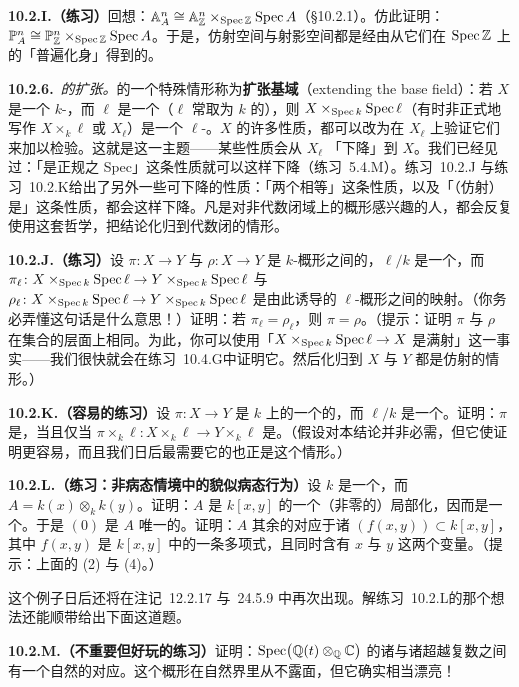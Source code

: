 \textbf{10.2.I.（练习）}\quad 回想：$\mathbb{A}^n_A\cong\mathbb{A}^n_{\mathbb{Z}}\times_{\operatorname{Spec}\mathbb{Z}}\operatorname{Spec} A$（\S10.2.1）。仿此证明：$\mathbb{P}^n_A\cong\mathbb{P}^n_{\mathbb{Z}}\times_{\operatorname{Spec}\mathbb{Z}}\operatorname{Spec} A$。于是，仿射空间与射影空间都是经由\trPullback{}从它们在\trFinalObject{} $\operatorname{Spec}\mathbb{Z}$ 上的「普遍化身」得到的。

\textbf{10.2.6.}\ \emph{\trBaseField{}的扩张。}\quad \trBaseChange{}的一个特殊情形称为\textbf{扩张基域}（extending the base field）：若 $X$ 是一个 $k$-\trScheme，而 $\ell$ 是一个\trFieldExtension（$\ell$ 常取为 $k$ 的\trAlgebraicClosure），则 $X\times_{\operatorname{Spec} k}\operatorname{Spec}\ell$（有时非正式地写作 $X\times_k\ell$ 或 $X_\ell$）是一个 $\ell$-\trScheme。$X$ 的许多性质，都可以改为在 $X_\ell$ 上验证它们来加以检验。这就是\emph{\trDescent}这一主题——某些性质会从 $X_\ell$ 「下降」到 $X$。我们已经见过：「是正规\trIntegralDomain{}之 Spec」这条性质就可以这样下降（\mbox{练习~5.4.M}）。\mbox{练习~10.2.J} 与\mbox{练习~10.2.K}给出了另外一些可下降的性质：「两个\trMorphism{}相等」这条性质，以及「（仿射）\trMorphism{}是\trClosedEmbedding」这条性质，都会这样下降。凡是对非代数闭域上的概形感兴趣的人，都会反复使用这套哲学，把结论化归到代数闭的情形。

\textbf{10.2.J.（练习）}\quad 设 $\pi\colon X\to Y$ 与 $\rho\colon X\to Y$ 是 $k$-概形之间的\trMorphism，$\ell/k$ 是一个\trFieldExtension，而 $\pi_\ell\colon X\times_{\operatorname{Spec} k}\operatorname{Spec}\ell\to Y\times_{\operatorname{Spec} k}\operatorname{Spec}\ell$ 与 $\rho_\ell\colon X\times_{\operatorname{Spec} k}\operatorname{Spec}\ell\to Y\times_{\operatorname{Spec} k}\operatorname{Spec}\ell$ 是由此诱导的 $\ell$-概形之间的映射。（你务必弄懂这句话是什么意思！）证明：若 $\pi_\ell=\rho_\ell$，则 $\pi=\rho$。（提示：证明 $\pi$ 与 $\rho$ 在集合的层面上相同。为此，你可以使用「$X\times_{\operatorname{Spec} k}\operatorname{Spec}\ell\to X$ 是满射」这一事实——我们很快就会在\mbox{练习~10.4.G}中证明它。然后化归到 $X$ 与 $Y$ 都是仿射的情形。）

\textbf{10.2.K.（容易的练习）}\quad 设 $\pi\colon X\to Y$ 是 $k$ 上的一个\trAffine{}的\trMorphism，而 $\ell/k$ 是一个\trFieldExtension。证明：$\pi$ 是\trClosedEmbedding，当且仅当 $\pi\times_k\ell\colon X\times_k\ell\to Y\times_k\ell$ 是\trClosedEmbedding。（\trAffine{}假设对本结论并非必需，但它使证明更容易，而且我们日后最需要它的也正是这个情形。）

\textbf{10.2.L.（练习：非病态情境中的貌似病态行为）}\quad 设 $k$ 是一个\trField，而 $A=k(x)\otimes_k k(y)$。证明：$A$ 是 $k[x,y]$ 的一个（非零的）局部化，因而是一个\trIntegralDomain。于是 $(0)$ 是 $A$ 唯一的\trMinimalPrimeIdeal。证明：$A$ 其余的\trPrimeIdeal{}对应于诸\trIdeal{} $(f(x,y))\subset k[x,y]$，其中 $f(x,y)$ 是 $k[x,y]$ 中的一条\trIrreducible{}多项式，且同时含有 $x$ 与 $y$ 这两个变量。（提示：上面的 (2) 与 (4)。）

这个例子日后还将在注记~12.2.17 与~24.5.9 中再次出现。解\mbox{练习~10.2.L}的那个想法还能顺带给出下面这道题。

\textbf{10.2.M.（不重要但好玩的练习）}\quad 证明：$\operatorname{Spec}\bigl(\mathbb{Q}(t)\otimes_{\mathbb{Q}}\mathbb{C}\bigr)$ 的诸\trClosedPoint{}与诸超越复数之间有一个自然的对应。这个概形在自然界里从不露面，但它确实相当漂亮！
